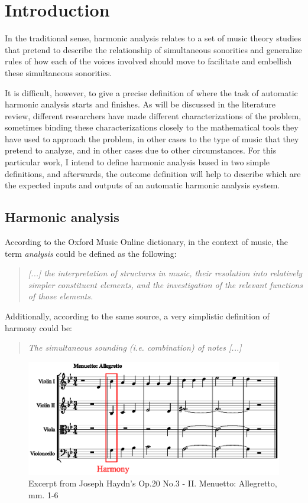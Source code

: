 \chapter{Introduction}
In the traditional sense, harmonic analysis relates to a set of music theory studies that pretend to describe the relationship of simultaneous sonorities and generalize rules of how each of the voices involved should move to facilitate and embellish these simultaneous sonorities.

It is difficult, however, to give a precise definition of where the task of automatic harmonic analysis starts and finishes. As will be discussed in the literature review, different researchers have made different characterizations of the problem, sometimes binding these characterizations closely to the mathematical tools they have used to approach the problem, in other cases to the type of music that they pretend to analyze, and in other cases due to other circumstances. For this particular work, I intend to define harmonic analysis based in two simple definitions, and afterwards, the outcome definition will help to describe which are the expected inputs and outputs of an automatic harmonic analysis system.

\section{Harmonic analysis}
According to the Oxford Music Online dictionary, in the context of music, the term \emph{analysis} could be defined as the following: \cite{oxfordanalysis}

\begin{quote}
\centering
\emph{[...] the interpretation of structures in music,
their resolution into relatively simpler constituent elements, and the investigation of the relevant functions of those elements.}
\end{quote}

Additionally, according to the same source, a very simplistic definition of harmony could be: \cite{oxfordharmony}

\begin{quote}
\centering
\emph{The simultaneous sounding (i.e. combination) of notes [...]}
\end{quote}

\begin{figure}[h]
  \caption{Excerpt from Joseph Haydn's Op.20 No.3 - II. Menuetto: Allegretto, mm. 1-6}
  \label{fig:harmony}
  \centering
    \includegraphics[width=1.0\textwidth]{01-introduction/figures/1}
\end{figure}

